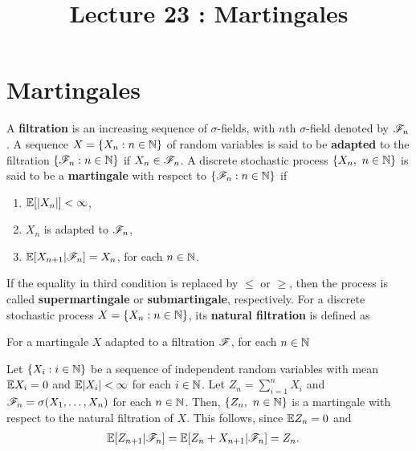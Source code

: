 \documentclass[a4paper,10pt,english]{article}
\title{Lecture 23 : Martingales}
\author{}
\begin{document}
\maketitle
\section{Martingales}
A \textbf{filtration} is an increasing sequence of $\sigma$-fields, with $n$th $\sigma$-field denoted by $\mathscr{F}_n$. 
A sequence $X = \{X_n: n \in \mathbb{N}\}$ of random variables is said to be \textbf{adapted} to the filtration $\{\mathscr{F}_n: n \in \mathbb{N}\}$ if $X_n \in \mathscr{F}_n$. 
A discrete stochastic process $\{X_n,~n \in \mathbb{N} \}$ is said to be a \textbf{martingale} with respect to $\{\mathscr{F}_n: n \in \mathbb{N}\}$ if 
\begin{enumerate}[i\_]
\item $\mathbb{E}[|X_n|]< \infty$,
\item $X_n$ is adapted to $\mathscr{F}_n$,
\item $\mathbb{E}[X_{n+1}|\mathscr{F}_n]=X_n$, for each $n \in \mathbb{N}$.
\end{enumerate}
If the equality in third condition is replaced by $\leq$ or $\geq$, then the process is called \textbf{supermartingale} or \textbf{submartingale}, respectively.
For a discrete stochastic process $X = \{X_n: n \in \mathbb{N}\}$, its \textbf{natural filtration} is defined as 
\begin{cor} For a martingale $X$ adapted to a filtration $\mathscr{F}$, for each $n \in \mathbb{N}$
\end{cor}
\begin{shaded*}
\begin{exmp*}
Let $\{X_i: i \in \mathbb{N}\}$ be a sequence of independent random variables with mean $\mathbb{E} X_i = 0$ and $\mathbb{E}|X_i| < \infty$ for each $i \in \mathbb{N}$. 
Let $Z_n=\sum_{i=1}^n X_i$ and $\mathscr{F}_n = \sigma(X_1, \dots, X_n)$ for each $n \in \mathbb{N}$. 
Then, $\{Z_n,~n \in \mathbb{N} \}$ is a martingale with respect to the natural filtration of $X$.  
This follows, since $\mathbb{E} Z_n=0$ and 
\begin{align*}
\mathbb{E}[Z_{n+1}|\mathscr{F}_n] =\mathbb{E}[Z_{n}+X_{n+1}|\mathscr{F}_n] &=Z_n.
\end{align*} 
\end{exmp*}
\end{shaded*}
\end{document}
